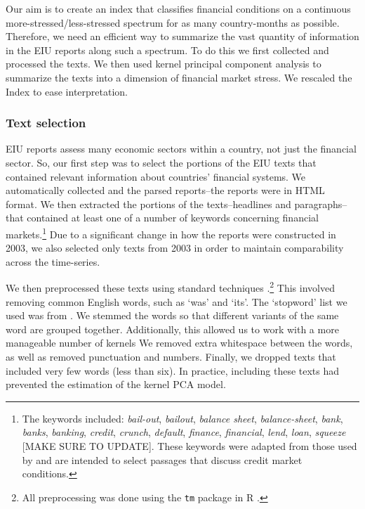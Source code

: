 \documentclass[]{article}
\begin{document}
Our aim is to create an index that classifies financial conditions on a continuous more-stressed/less-stressed spectrum for as many country-months as possible. Therefore, we need an efficient way to summarize the vast quantity of information in the EIU reports along such a spectrum. To do this we first collected and processed the texts. We then used kernel principal component analysis to summarize the texts into a
dimension of financial market stress. We rescaled the Index to ease
interpretation.

\subsubsection{Text selection}\label{text-selection}

EIU reports assess many economic sectors within a country,
not just the financial sector. So, our first step was to select the portions of the EIU texts that contained relevant information about countries' financial systems. We automatically collected and the parsed reports--the reports were in HTML format. We then extracted the portions of the texts--headlines and paragraphs--that contained at least one of a number of keywords concerning financial markets.\footnote{The
  keywords included: \emph{bail-out}, \emph{bailout}, \emph{balance
  sheet}, \emph{balance-sheet}, \emph{bank}, \emph{banks},
  \emph{banking}, \emph{credit}, \emph{crunch}, \emph{default},
  \emph{finance}, \emph{financial}, \emph{lend}, \emph{loan},
  \emph{squeeze} {[}MAKE SURE TO UPDATE{]}. These keywords were adapted
  from those used by \cite{Romer2015} and are intended to
  select passages that discuss credit market conditions.} Due to a significant change in how the reports were constructed in 2003, we also
selected only texts from 2003 in order to maintain comparability across
the time-series.

We then preprocessed these texts using standard techniques \citep[see][]{Grimmer2013}.\footnote{All preprocessing was done using the \texttt{tm} package \citep{tm2015} in R \citep{R-cite}.} This involved removing common English words, such as `was' and `its'. The `stopword' list we used was from \cite{dhillon:modha:mlj01}. We stemmed the words so that different variants of the same word are grouped together. Additionally, this allowed us to work with a more manageable number of kernels  We removed extra whitespace between the words, as well as removed punctuation and numbers. Finally, we dropped texts that included very few words (less than six). In practice, including these texts had prevented the estimation of the kernel PCA model.
\end{document}
